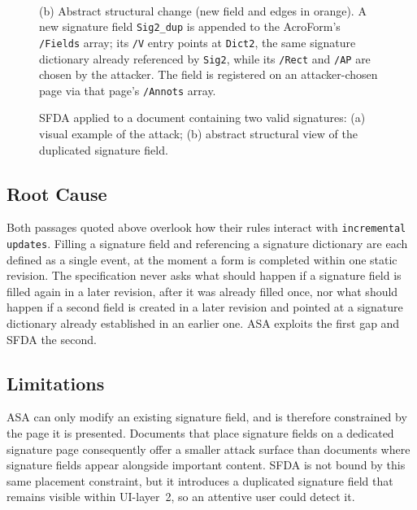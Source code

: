 \documentclass[12pt]{article}
\begin{document}
\begin{figure}[htb]
\begin{minipage}{\linewidth}
\\[3pt]
		{\footnotesize (b) Abstract structural change (new field and edges in orange). A new signature field \texttt{Sig2\_dup} is appended to the AcroForm's \texttt{/Fields} array; its \texttt{/V} entry points at \texttt{Dict2}, the same signature dictionary already referenced by \texttt{Sig2}, while its \texttt{/Rect} and \texttt{/AP} are chosen by the attacker. The field is registered on an attacker-chosen page via that page's \texttt{/Annots} array.}
	\end{minipage}
	\caption{SFDA applied to a document containing two valid signatures: (a) visual example of the attack; (b) abstract structural view of the duplicated signature field.\label{fig:sfda-example}}
\end{figure}

\subsection{Root Cause}

Both passages quoted above overlook how their rules interact with \texttt{incremental updates}. Filling a signature field and referencing a signature dictionary are each defined as a single event, at the moment a form is completed within one static revision. The specification never asks what should happen if a signature field is filled again in a later revision, after it was already filled once, nor what should happen if a second field is created in a later revision and pointed at a signature dictionary already established in an earlier one. ASA exploits the first gap and SFDA the second.

\subsection{Limitations}

ASA can only modify an existing signature field, and is therefore constrained by the page it is presented. Documents that place signature fields on a dedicated signature page consequently offer a smaller attack surface than documents where signature fields appear alongside important content. SFDA is not bound by this same placement constraint, but it introduces a duplicated signature field that remains visible within UI-layer~2, so an attentive user could detect it.
\end{document}
